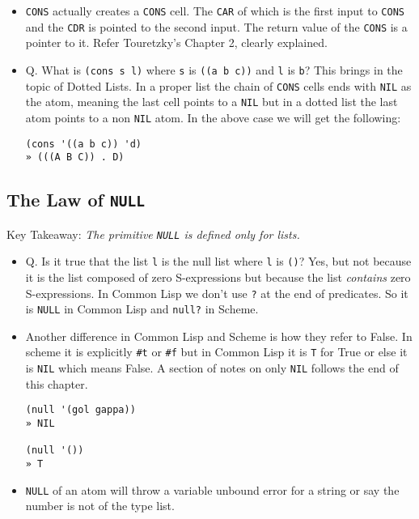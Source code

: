 \documentclass[11pt]{article}
\begin{document}
\begin{itemize}
\item \texttt{CONS} actually creates a \texttt{CONS} cell. The \texttt{CAR} of which is the first input to \texttt{CONS} and the \texttt{CDR} is pointed to
the second input. The return value of the \texttt{CONS} is a pointer to it. Refer Touretzky's Chapter 2, clearly explained.
\item Q. What is \texttt{(cons s l)} where \texttt{s} is \texttt{((a b c))} and \texttt{l} is \texttt{b}? This brings in the topic of Dotted Lists. In a
proper list the chain of \texttt{CONS} cells ends with \texttt{NIL} as the atom, meaning the last cell points to a \texttt{NIL} but in a
dotted list the last atom points to a non \texttt{NIL} atom. In the above case we will get the following:
\begin{verbatim}
(cons '((a b c)) 'd)
» (((A B C)) . D)

\end{verbatim}
\end{itemize}


\subsection{The Law of \texttt{NULL}}
\label{sec:org4225367}
Key Takeaway:
\emph{The primitive \texttt{NULL} is defined only for lists.}

\vspace{1em}

\begin{itemize}
\item Q. Is it true that the list \texttt{l} is the null list where \texttt{l} is \texttt{()}? Yes, but not because it is the list composed of
zero S-expressions but because the list \emph{contains} zero S-expressions. In Common Lisp we don't use \texttt{?} at the end
of predicates. So it is \texttt{NULL} in Common Lisp and \texttt{null?} in Scheme.
\item Another difference in Common Lisp and Scheme is how they refer to False. In scheme it is explicitly \texttt{\#t} or \texttt{\#f} but
in Common Lisp it is \texttt{T} for True or else it is \texttt{NIL} which means False. A section of notes on only \texttt{NIL} follows
the end of this chapter.
\begin{verbatim}
(null '(gol gappa))
» NIL

(null '())
» T

\end{verbatim}
\item \texttt{NULL} of an atom will throw a variable unbound error for a string or say the number is not of the type list.
\end{itemize}
\end{document}
